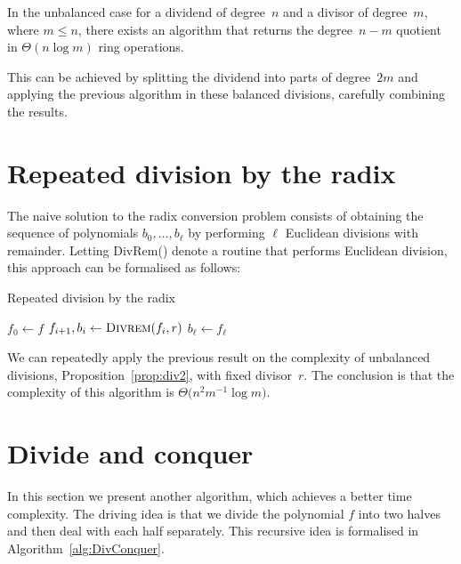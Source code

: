 \begin{prop} \label{prop:div2}
In the unbalanced case for a dividend of degree~$n$ and 
a divisor of degree~$m$, where $m \leq n$, there exists an 
algorithm that returns the degree~\mbox{$n-m$} quotient in 
$\Theta(n \log m)$ ring operations.
\end{prop}

This can be achieved by splitting the dividend into parts of degree~$2m$ 
and applying the previous algorithm in these balanced divisions, carefully 
combining the results.


\section{Repeated division by the radix}

The naive solution to the radix conversion problem consists of 
obtaining the sequence of polynomials $b_0, \dotsc, b_{\ell}$ 
by performing $\ell$ Euclidean divisions with remainder.  Letting 
{\sc DivRem()} denote a routine that performs Euclidean division, 
this approach can be formalised as follows:

\begin{algorithm}[H]
\caption{Repeated division by the radix}
\label{alg:RepeatedDivision}
\begin{algorithmic}
\vspace{1mm}
\State $f_0 \gets f$
\State $f_{i+1}, b_i \gets \Call{Divrem}{f_i, r}$
\EndFor
\State $b_{\ell} \gets f_{\ell}$
\EndProcedure
\end{algorithmic}
\end{algorithm}

We can repeatedly apply the previous result on the complexity 
of unbalanced divisions, Proposition~\ref{prop:div2}, with 
fixed divisor~$r$.  The conclusion is that the complexity 
of this algorithm is $\Theta \bigl( n^2 m^{-1} \log m \bigr)$.


\section{Divide and conquer}

In this section we present another algorithm, which achieves 
a better time complexity.  The driving idea is that we divide 
the polynomial $f$ into two halves and then deal with each half 
separately.  This recursive idea is formalised in 
Algorithm~\ref{alg:DivConquer}.

